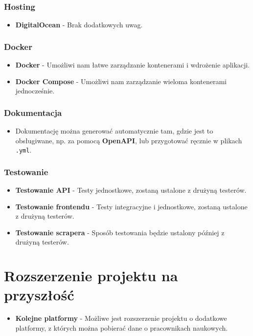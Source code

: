 \documentclass{article}
\begin{document}
\subsubsection{Hosting}
\begin{itemize}
  \item \textbf{DigitalOcean} - Brak dodatkowych uwag.
\end{itemize}

\subsubsection{Docker}
\begin{itemize}
  \item \textbf{Docker} - Umożliwi nam łatwe zarządzanie kontenerami i wdrożenie aplikacji.
  \item \textbf{Docker Compose} - Umożliwi nam zarządzanie wieloma kontenerami jednocześnie.
\end{itemize}

\subsubsection{Dokumentacja}
\begin{itemize}
  \item Dokumentację można generować automatycznie tam, gdzie jest to obsługiwane, np. za pomocą \textbf{OpenAPI}, lub przygotować ręcznie w plikach \texttt{.yml}.
\end{itemize}

\subsubsection{Testowanie}
\begin{itemize}
  \item \textbf{Testowanie API} - Testy jednostkowe, zostaną ustalone z drużyną testerów.
  \item \textbf{Testowanie frontendu} - Testy integracyjne i jednostkowe, zostaną ustalone z drużyną testerów.
  \item \textbf{Testowanie scrapera} - Sposób testowania będzie ustalony później z drużyną testerów.
\end{itemize}
\newpage
\section{Rozszerzenie projektu na przyszłość}
\begin{itemize}
  \item \textbf{Kolejne platformy} - Możliwe jest rozszerzenie projektu o dodatkowe platformy, z których można pobierać dane o pracownikach naukowych.
\end{itemize}
\end{document}
